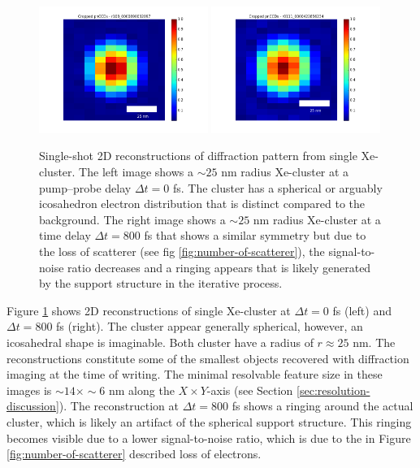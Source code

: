 \begin{figure}
	\centering
		\includegraphics[width=0.49\textwidth]{images/results/Xe_0_fs.png}
		\includegraphics[width=0.49\textwidth]{images/results/Xe_800_fs.png}
	\caption[Single-shot 2D reconstructions of $\sim 25$ nm radius Xe-clusters.]{Single-shot 2D reconstructions of diffraction pattern from single Xe-cluster. The left image shows a $\sim 25$ nm radius Xe-cluster at a pump--probe delay $\Delta t=0$ fs. The cluster has a spherical or arguably icosahedron electron distribution that is distinct compared to the background. The right image shows a $\sim 25$ nm radius Xe-cluster at a time delay $\Delta t=800$ fs that shows a similar symmetry but due to the loss of scatterer (see fig \ref{fig:number-of-scatterer}), the signal-to-noise ratio decreases and a ringing appears that is likely generated by the support structure in the iterative process.}
	\label{fig:Xe-2D-reconstructions}
\end{figure}
Figure \ref{fig:Xe-2D-reconstructions} shows 2D reconstructions of single Xe-cluster at $\Delta t = 0$ fs (left) and $\Delta t=800$ fs (right). The cluster appear generally spherical, however, an icosahedral shape is imaginable. Both cluster have a radius of $r\approx 25$ nm. The reconstructions constitute some of the smallest objects recovered with diffraction imaging at the time of writing. The minimal resolvable feature size in these images is $\sim 14\times \sim 6$ nm along the $X\times Y$-axis (see Section \ref{sec:resolution-discussion}). The reconstruction at $\Delta t=800$ fs shows a ringing around the actual cluster, which is likely an artifact of the spherical support structure. This ringing becomes visible due to a lower signal-to-noise ratio, which is due to the in Figure \ref{fig:number-of-scatterer} described loss of electrons.
%
%
%
